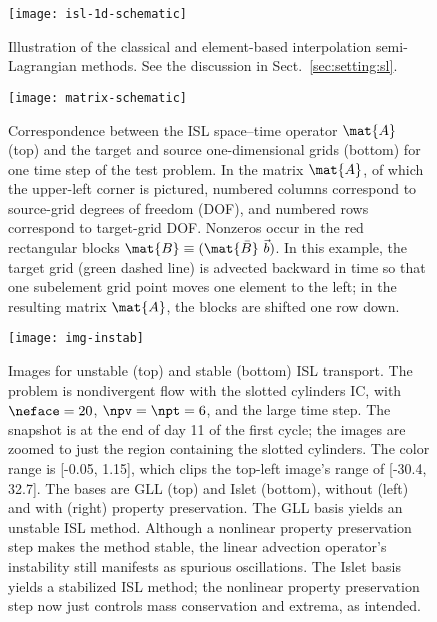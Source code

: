 \begin{figure}[tb]
  \centering
  \texttt{[image: isl-1d-schematic]}
  \caption{
    Illustration of the classical and element-based interpolation semi-Lagrangian methods.
    See the discussion in Sect.~\ref{sec:setting:sl}.
  }
  \label{fig:isl-1d-schematic}
\end{figure}

\begin{figure}[tb]
  \centering
  \texttt{[image: matrix-schematic]}
  \caption{
    Correspondence between the ISL space--time operator $\mat{A}$ (top)
    and the target and source one-dimensional grids (bottom)
    for one time step of the test problem.
    In the matrix $\mat{A}$, of which the upper-left corner is pictured,
    numbered columns correspond to source-grid degrees of freedom (DOF),
    and numbered rows correspond to target-grid DOF.
    Nonzeros occur in the red rectangular blocks $\mat{B} \equiv (\mat{\bar{B}} \ \vec{b})$.
    In this example, the target grid (green dashed line) is advected backward in time
    so that one subelement grid point moves one element to the left;
    in the resulting matrix $\mat{A}$, the blocks are shifted one row down.
  }
  \label{fig:matrix-schematic}
\end{figure}

\begin{figure}[tb]
  \centering
  \texttt{[image: img-instab]}
  \caption{
    Images for unstable (top) and stable (bottom) ISL transport.
    The problem is nondivergent flow with the slotted cylinders IC,
    with $\neface = 20$, $\npv = \npt = 6$, and the large time step.
    The snapshot is at the end of day 11 of the first cycle;
    the images are zoomed to just the region containing the slotted cylinders.
    The color range is [-0.05, 1.15],
    which clips the top-left image's range of [-30.4, 32.7].
    The bases are GLL (top) and Islet (bottom),
    without (left) and with (right) property preservation.
    The GLL basis yields an unstable ISL method.
    Although a nonlinear property preservation step makes the method stable,
    the linear advection operator's instability still manifests as spurious oscillations.
    The Islet basis yields a stabilized ISL method;
    the nonlinear property preservation step now just controls mass conservation and extrema,
    as intended.
  }
  \label{fig:islet-vs-gll-img}
\end{figure}
